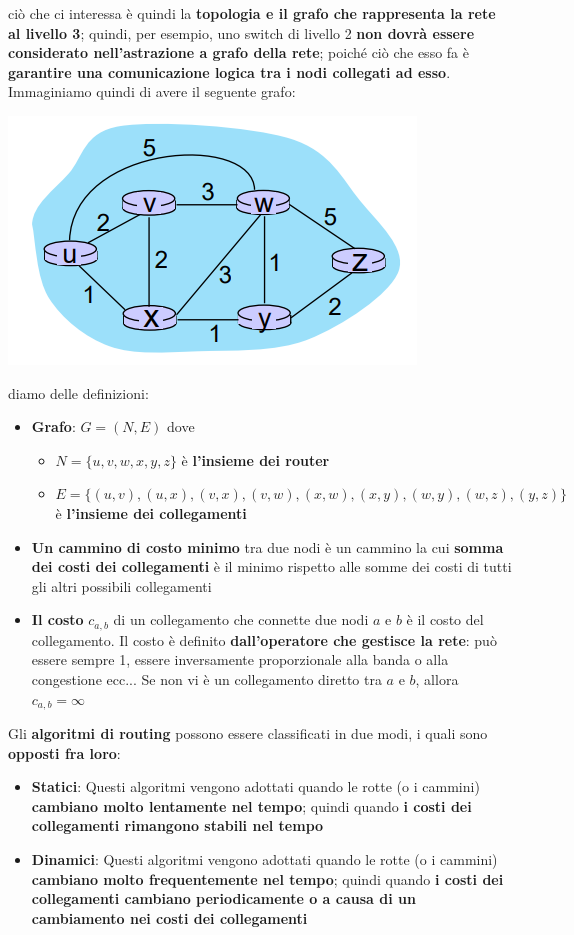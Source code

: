 \documentclass[12pt]{article}
\begin{document}
ciò che ci interessa è quindi la \textbf{topologia e il grafo che rappresenta la rete al livello 3}; quindi, per esempio, uno switch di livello
2 \textbf{non dovrà essere considerato nell'astrazione a grafo della rete}; poiché ciò che esso fa è \textbf{garantire una comunicazione logica tra i nodi collegati ad esso}.
Immaginiamo quindi di avere il seguente grafo:
\begin{center}
    \includegraphics[width =0.40\linewidth]{Images/97.png}
\end{center}
diamo delle definizioni:
\begin{itemize}
    \item \textbf{Grafo}: $G = (N, E)$ dove
    \begin{itemize}
        \item $N = \{u,v,w,x,y,z\}$ è \textbf{l'insieme dei router}
        \item $E = \{(u,v), (u,x), (v,x), (v,w), (x,w), (x,y), (w,y), (w,z), (y,z)\}$ è \textbf{l'insieme dei collegamenti}
    \end{itemize}
    \item \textbf{Un cammino di costo minimo} tra due nodi è un cammino la cui \textbf{somma dei costi dei collegamenti} è il minimo rispetto alle somme dei costi di tutti gli altri possibili collegamenti
    \item \textbf{Il costo} $c_{a,b}$ di un collegamento che connette due nodi $a$ e $b$ è il costo del collegamento. Il costo è definito \textbf{dall'operatore che gestisce la rete}: può essere sempre 1, essere inversamente proporzionale alla banda o alla congestione ecc...  
    Se non vi è un collegamento diretto tra $a$ e $b$, allora $c_{a,b} = \infty$
\end{itemize}
Gli \textbf{algoritmi di routing} possono essere classificati in due modi, i quali sono \textbf{opposti fra loro}:
\begin{itemize}
    \item \textbf{Statici}: Questi algoritmi vengono adottati quando le rotte (o i cammini) \textbf{cambiano molto lentamente nel tempo}; quindi quando \textbf{i costi dei collegamenti rimangono stabili nel tempo}
    \item \textbf{Dinamici}: Questi algoritmi vengono adottati quando le rotte (o i cammini) \textbf{cambiano molto frequentemente nel tempo}; quindi quando \textbf{i costi dei collegamenti cambiano periodicamente o a causa di un cambiamento nei costi dei collegamenti}
\end{itemize}
\end{document}
